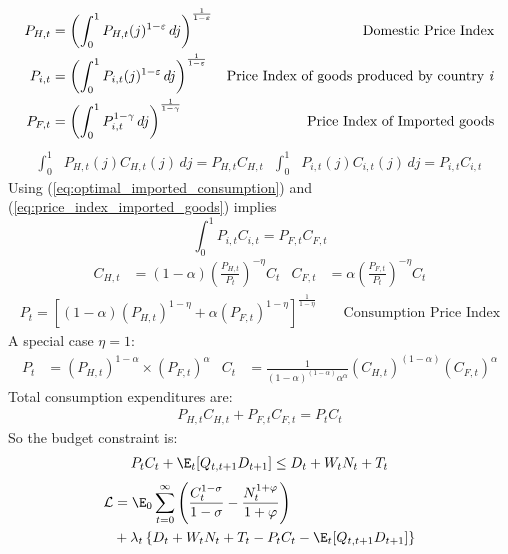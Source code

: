 \begin{align}
    P_{H,t} & = \left( \int_{0}^{1} P_{H,t}(j)^{1-\varepsilon} \,dj  \right)^{\frac{1}{1-\varepsilon}}                                  & \text{Domestic Price Index}                                \\
    P_{i,t} & = \left( \int_{0}^{1} P_{i,t}(j)^{1-\varepsilon} \,dj  \right)^{\frac{1}{1-\varepsilon}}                                  & \text{Price Index of goods produced by country \textit{i}} \\
    P_{F,t} & = \left( \int_{0}^{1} P_{i,t}^{1-\gamma} \,dj  \right)^{\frac{1}{1-\gamma}}         \label{eq:price_index_imported_goods} & \text{Price Index of Imported goods}
\end{align}
\begin{align}
    \int_{0}^{1} & P_{H,t}(j)C_{H,t}(j) \,dj = P_{H,t}C_{H,t} & \int_{0}^{1} & P_{i,t}(j)C_{i,t}(j) \,dj = P_{i,t}C_{i,t}
\end{align}
Using (\ref{eq:optimal_imported_consumption}) and (\ref{eq:price_index_imported_goods}) implies
\begin{equation}
    \int_{0}^{1} P_{i,t}C_{i,t} = P_{F,t}C_{F,t}
\end{equation}
\begin{align}
    C_{H,t} & = (1-\alpha) {\left(\frac{P_{H,t}}{P_t}\right)}^{-\eta} C_{t} & C_{F,t} & = \alpha {\left(\frac{P_{F,t}}{P_t}\right)}^{-\eta} C_{t}
\end{align}
\begin{align}
    P_t = \left[ (1-\alpha) (P_{H,t})^{1-\eta} + \alpha (P_{F,t})^{1-\eta} \right]^{\frac{1}{1-\eta}} &  & \text{ Consumption Price Index}
\end{align}
A special case $\eta=1$:
\begin{align}
    P_t & = (P_{H,t})^{1-\alpha} \times (P_{F,t})^{\alpha} & C_t & = \frac{1}{(1-\alpha)^{(1-\alpha)}\alpha^\alpha}(C_{H,t})^{(1-\alpha)}(C_{F,t})^\alpha
\end{align}
Total consumption expenditures are:
\begin{align}
    P_{H,t}C_{H,t} + P_{F,t}C_{F,t} = P_t C_t
\end{align}
So the budget constraint is:
\begin{align}
    P_t C_t + \E_t [Q_{t,t+1}D_{t+1}] \leq D_t + W_t N_t + T_t
\end{align}
\begin{align}
    \mathcal{L} & = \E_0 \sum^{\infty}_{t=0} \left( \frac{C_t^{1-\sigma}}{1-\sigma} - \frac{N_t^{1+\varphi}}{1+\varphi} \right)  \nonumber \\ &+ \lambda_t\left\{  D_t + W_t N_t + T_t - P_t C_t - \E_t [Q_{t,t+1}D_{t+1}] \right\}
\end{align}
